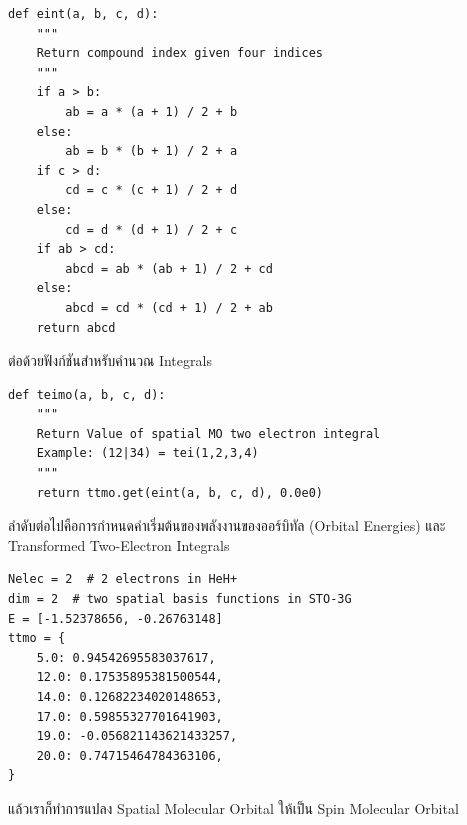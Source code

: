 \vspace{5pt}

\begin{lstlisting}[style=MyPython]
def eint(a, b, c, d):
    """
    Return compound index given four indices
    """    
    if a > b:
        ab = a * (a + 1) / 2 + b
    else:
        ab = b * (b + 1) / 2 + a
    if c > d:
        cd = c * (c + 1) / 2 + d
    else:
        cd = d * (d + 1) / 2 + c
    if ab > cd:
        abcd = ab * (ab + 1) / 2 + cd
    else:
        abcd = cd * (cd + 1) / 2 + ab
    return abcd
\end{lstlisting}

\vspace{5pt}

\noindent ต่อด้วยฟังก์ชันสำหรับคำนวณ Integrals

\vspace{5pt}

\begin{lstlisting}[style=MyPython]
def teimo(a, b, c, d):
    """
    Return Value of spatial MO two electron integral
    Example: (12|34) = tei(1,2,3,4)
    """
    return ttmo.get(eint(a, b, c, d), 0.0e0)
\end{lstlisting}

\vspace{5pt}

\noindent ลำดับต่อไปคือการกำหนดค่าเริ่มต้นของพลังงานของออร์บิทัล (Orbital Energies) และ Transformed Two-Electron Integrals

\vspace{5pt}

\begin{lstlisting}[style=MyPython]
Nelec = 2  # 2 electrons in HeH+
dim = 2  # two spatial basis functions in STO-3G
E = [-1.52378656, -0.26763148]
ttmo = {
    5.0: 0.94542695583037617,
    12.0: 0.17535895381500544,
    14.0: 0.12682234020148653,
    17.0: 0.59855327701641903,
    19.0: -0.056821143621433257,
    20.0: 0.74715464784363106,
}
\end{lstlisting}

\vspace{5pt}

\noindent แล้วเราก็ทำการแปลง Spatial Molecular Orbital ให้เป็น Spin Molecular Orbital

\vspace{5pt}

